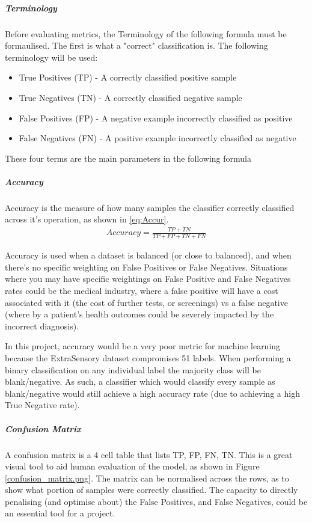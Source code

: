 \documentclass{UoNMCHA}
\newcommand{\fref}[1] {Figure \ref{#1}}
\numberwithin{equation}{section}
\begin{document}
\subparagraph{Terminology} 
Before evaluating metrics, the Terminology of the following formula must be formaulised. The first is what a "correct" classification is. The following terminology will be used:
\begin{itemize}
    \item True Positives (TP) - A correctly classified positive sample
    \item True Negatives (TN) - A correctly classified negative sample
    \item False Positives (FP) - A negative example incorrectly classified as positive
    \item False Negatives (FN) - A positive example incorrectly classified as negative
\end{itemize}

These four terms are the main parameters in the following formula

\subparagraph{Accuracy} 
Accuracy is the measure of how many samples the classifier correctly classified across it's operation, as shown in \ref{eq:Accur}.
\begin{gather}\label{eq:Accur}
    Accuracy = \frac{TP+TN}{TP+FP+TN+FN}
\end{gather}

Accuracy is used when a dataset is balanced (or close to balanced), and when there's no specific weighting on False Positives or False Negatives. Situations where you may have specific weightings on False Positive and False Negatives rates could be the medical industry, where a false positive will have a cost associated with it (the cost of further tests, or screenings) vs a false negative (where by a patient's health outcomes could be severely impacted by the incorrect diagnosis).

In this project, accuracy would be a very poor metric for machine learning because the ExtraSensory dataset compromises 51 labels. When performing a binary classification on any individual label the majority class will be blank/negative. As such, a classifier which would classify every sample as blank/negative would still achieve a high accuracy rate (due to achieving a high True Negative rate).

\subparagraph{Confusion Matrix}
A confusion matrix is a 4 cell table that lists TP, FP, FN, TN. This is a great visual tool to aid human evaluation of the model, as shown in \fref{confusion_matrix.png}. The matrix can be normalised across the rows, as to show what portion of samples were correctly classified. The capacity to directly penalising (and optimise about) the False Positives, and False Negatives, could be an essential tool for a project. 
\end{document}
